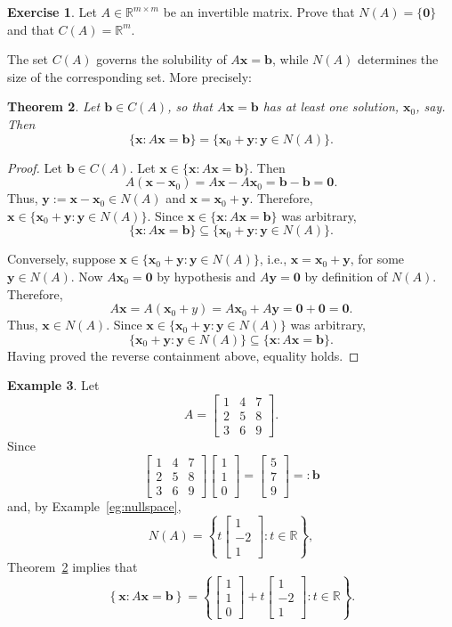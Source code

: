 \documentclass[12pt]{amsart}
\newcommand{\RR}{\mathbb{R}}
\newtheorem{theorem}{Theorem}[section]
\theoremstyle{definition} \newtheorem{definition}[theorem]{Definition}
\newtheorem{example}[theorem]{Example}
\newtheorem{exercise}[theorem]{Exercise}
\newcommand{\bb}{\mathbf{b}}
\newcommand{\bv}{\mathbf{v}}
\newcommand{\bx}{\mathbf{x}}
\newcommand{\by}{\mathbf{y}}
\newcommand{\bzero}{\mathbf{0}}
\newcommand{\mat}[1]{\begin{bmatrix}#1\end{bmatrix}}
\begin{document}
\begin{exercise}\label{ex:invertible_nullsapce_col_space}
  Let $A\in\RR^{m\times m}$ be an invertible matrix. Prove that $N(A)=\{\bzero\}$ and that $C(A)=\RR^m$.
\end{exercise}

The set $C(A)$ governs the solubility of $A\bx=\bb$, while $N(A)$ determines the size of the corresponding set. More precisely:

\begin{theorem}\label{th:particular_plus_general}
  Let $\bb\in C(A)$, so that $A\bx=\bb$ has at least one solution, $\bx_0$, say. Then
      \begin{equation*}
        \{\bx : A\bx=\bb\} = \{\bx_0 + \by : \by\in N(A)\}.
  \end{equation*}
\end{theorem}

\begin{proof}
Let $\bb\in C(A)$.
Let $\bx\in \{\bx : A\bx=\bb\}$.
Then
  \[
    A(\bx-\bx_0) = A\bx - A\bx_0 = \bb - \bb = \bzero.
  \]
  Thus, $\by := \bx-\bx_0\in N(A)$ and $\bx = \bx_0 + \by$.
  Therefore, $\bx\in \{\bx_0 + \by : \by\in N(A)\}$.
  Since $\bx\in \{\bx : A\bx=\bb\}$ was arbitrary,
  \[
    \{\bx : A\bx=\bb\}\subseteq\{\bx_0 + \by : \by\in N(A)\}.
  \]

  Conversely, suppose $\bx\in \{\bx_0 + \by : \by\in N(A)\}$, i.e., $\bx = \bx_0 + \by$, for some $\by\in N(A)$.
  Now $A\bx_0=\bzero$ by hypothesis and $A\by=\bzero$ by definition of $N(A)$.
  Therefore,
  \[
    A\bx = A(\bx_0 + y) = A\bx_0 + A\by = \bzero + \bzero = \bzero.
  \]
  Thus, $\bx\in N(A)$.
  Since $\bx\in \{\bx_0 + \by : \by\in N(A)\}$ was arbitrary,
  \[
    \{\bx_0 + \by : \by\in N(A)\}\subseteq \{\bx : A\bx=\bb\}.
  \]
  Having proved the reverse containment above, equality holds. 
\end{proof}

\begin{example}
  Let
  \[
    A = \mat{1&4&7\\2&5&8\\3&6&9}.
  \]
  Since
  \[
    \mat{1&4&7\\2&5&8\\3&6&9}\mat{1\\1\\0} = \mat{5\\7\\9} =: \bb
  \]
  and, by Example~\ref{eg:nullspace}, 
  \[
    N(A) =\left\{t\mat{1\\-2\\1} : t\in\RR\right\},
  \]
  Theorem~\ref{th:particular_plus_general} implies that
  \[
    \left\{\bx : A\bx=\bb\right\} =
    \left\{\mat{1\\1\\0} + t\mat{1\\-2\\1}: t\in\RR\right\}.
  \]
\end{example}
\end{document}
